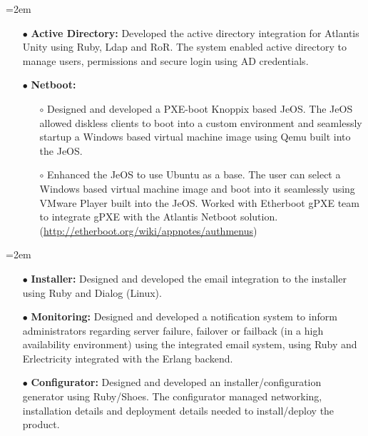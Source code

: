 \documentclass{scrartcl}
\newcommand{\MarginDate}[1]{\marginpar{\raggedleft\itshape\small#1}}
\newcommand{\Description}[1]{\hangindent=2em\hangafter=0\noindent\raggedright\footnotesize{#1}\par\normalsize}
\begin{document}
\begin{cv}{
\href{http://www.develmj.com}{}
}
\Description{
\begin{itemize}
  \item[\footnotesize$\bullet$] \textbf{Active Directory: }Developed\MarginDate{Atlantis Unity}
    the active directory integration for Atlantis Unity using Ruby, Ldap
    and RoR. The system
    enabled active directory to manage users, permissions and secure
    login using AD credentials.
  \item[\footnotesize$\bullet$] \textbf{Netboot:}
   \begin{itemize}
   \item[$\circ$]Designed and
     developed a PXE-boot Knoppix based JeOS. The JeOS allowed diskless
     clients to boot into a custom environment and seamlessly
     startup a Windows based virtual machine image using Qemu built into the JeOS.
   \item[$\circ$]Enhanced the JeOS to use Ubuntu as a base. The
     user can select a Windows based virtual machine image and boot into it seamlessly using VMware Player
     built into the JeOS. Worked with Etherboot gPXE team to integrate gPXE
     with the Atlantis Netboot
     solution.\\(\url{http://etherboot.org/wiki/appnotes/authmenus})
   \end{itemize}
\end{itemize}
}

\vspace{0.5em}

\Description{
\begin{itemize}
  \item[\footnotesize$\bullet$] \textbf{Installer: } Designed and developed the email\MarginDate{Atlantis Ilio}
    integration to the installer using Ruby and Dialog
    (Linux).
  \item[\footnotesize$\bullet$] \textbf{Monitoring: } Designed and developed a
    notification system to inform administrators regarding server
    failure, failover or failback (in a high availability environment)
    using the integrated email system, using Ruby and Erlectricity integrated
    with the Erlang backend.
  \item[\footnotesize$\bullet$] \textbf{Configurator: }Designed and
    developed  an installer/configuration generator
    using Ruby/Shoes. The configurator managed networking,
    installation details and deployment details needed to
    install/deploy the product.
\end{itemize}
}

\vspace{1.5em}


\end{cv}
\end{document}
